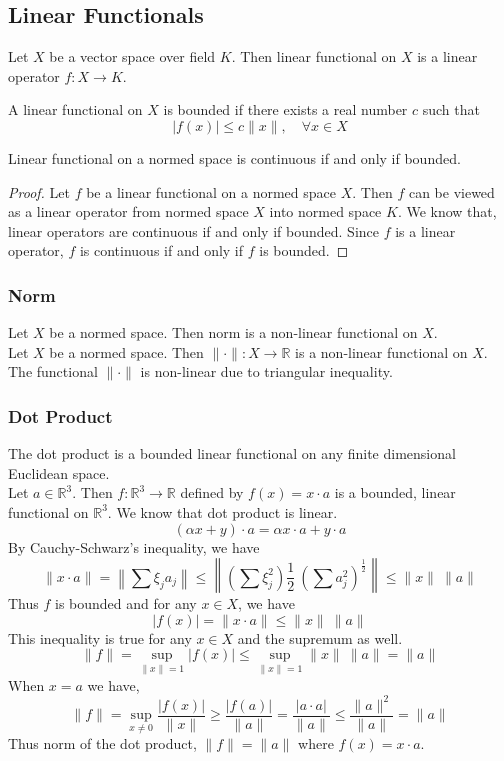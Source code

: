 \subsection{Linear Functionals}
\begin{definition}
	Let $X$ be a vector space over field $K$.
	Then linear functional on $X$ is a linear operator $f : X \to K$.
\end{definition}
\begin{definition}
	A linear functional on $X$ is bounded if there exists a real number $c$ such that
	\[ |f(x)| \le c\|x\|,\quad \forall x \in X \]
\end{definition}

\begin{theorem}
	Linear functional on a normed space is continuous if and only if bounded.
\end{theorem}
\begin{proof}
	Let $f$ be a linear functional on a normed space $X$.
	Then $f$ can be viewed as a linear operator from normed space $X$ into normed space $K$.
	We know that, linear operators are continuous if and only if bounded.
	Since $f$ is a linear operator, $f$ is continuous if and only if $f$ is bounded.
\end{proof}

\subsubsection{Norm} Let $X$ be a normed space. Then norm is a non-linear functional on $X$.\\

		Let $X$ be a normed space.
		Then $\|\cdot\| : X \to \mathbb{R}$ is a non-linear functional on $X$.
		The functional $\|\cdot\|$ is non-linear due to triangular inequality.

\subsubsection{Dot Product}
The dot product is a bounded linear functional on any finite dimensional Euclidean space.\\

		Let $a \in \mathbb{R}^3$.
		Then $f : \mathbb{R}^3 \to \mathbb{R}$ defined by $f(x) = x \cdot a$ is a bounded, linear functional on $\mathbb{R}^3$.
		We know that dot product is linear.
		\[ (\alpha x+y) \cdot a = \alpha x \cdot a + y \cdot a \]
		By Cauchy-Schwarz's inequality, we have 
		\[ \|x \cdot a\| = \left\| \sum \xi_j a_j \right\| \le \left\| \left( \sum \xi_j^2 \right)\frac{1}{2} \ \left(\sum a_j^2 \right)^\frac{1}{2} \right\| \le \|x\| \ \|a\| \]
		Thus $f$ is bounded and for any $x \in X$, we have
		\[ |f(x)| = \|x \cdot a\| \le \|x\| \ \|a\| \]
		This inequality is true for any $x \in X$ and the supremum as well.
		\[ \|f\| = \sup_{\|x\| = 1} |f(x)| \le \sup_{\|x\| = 1 } \|x\| \ \|a\| = \|a\| \]
		When $x = a$ we have,
		\[ \|f\| = \sup_{x \ne 0} \frac{|f(x)|}{\|x\|} \ge \frac{|f(a)|}{\|a\|} = \frac{|a \cdot a|}{\|a\|} \le \frac{\|a\|^2}{\|a\|} = \| a \| \]
		Thus norm of the dot product, $\|f\| = \|a\|$ where $f(x) = x \cdot a$.
